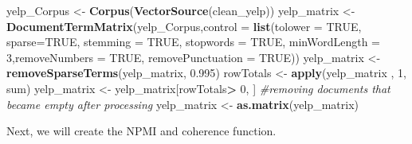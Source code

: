 \documentclass[]{article}
\newenvironment{Shaded}{\begin{snugshade}}{\end{snugshade}}
\newcommand{\CommentTok}[1]{\textcolor[rgb]{0.56,0.35,0.01}{\textit{#1}}}
\newcommand{\DataTypeTok}[1]{\textcolor[rgb]{0.13,0.29,0.53}{#1}}
\newcommand{\DecValTok}[1]{\textcolor[rgb]{0.00,0.00,0.81}{#1}}
\newcommand{\FloatTok}[1]{\textcolor[rgb]{0.00,0.00,0.81}{#1}}
\newcommand{\KeywordTok}[1]{\textcolor[rgb]{0.13,0.29,0.53}{\textbf{#1}}}
\newcommand{\NormalTok}[1]{#1}
\newcommand{\OperatorTok}[1]{\textcolor[rgb]{0.81,0.36,0.00}{\textbf{#1}}}
\newcommand{\OtherTok}[1]{\textcolor[rgb]{0.56,0.35,0.01}{#1}}
\newcommand{\StringTok}[1]{\textcolor[rgb]{0.31,0.60,0.02}{#1}}
\begin{document}
\begin{Shaded}
\begin{Highlighting}[]
\NormalTok{yelp_Corpus <-}\StringTok{ }\KeywordTok{Corpus}\NormalTok{(}\KeywordTok{VectorSource}\NormalTok{(clean_yelp))}
\NormalTok{yelp_matrix <-}\StringTok{ }\KeywordTok{DocumentTermMatrix}\NormalTok{(yelp_Corpus,}\DataTypeTok{control =} \KeywordTok{list}\NormalTok{(}\DataTypeTok{tolower =} \OtherTok{TRUE}\NormalTok{, }\DataTypeTok{sparse=}\OtherTok{TRUE}\NormalTok{, }\DataTypeTok{stemming =} \OtherTok{TRUE}\NormalTok{, }\DataTypeTok{stopwords =} \OtherTok{TRUE}\NormalTok{, }\DataTypeTok{minWordLength =} \DecValTok{3}\NormalTok{,}\DataTypeTok{removeNumbers =} \OtherTok{TRUE}\NormalTok{, }\DataTypeTok{removePunctuation =} \OtherTok{TRUE}\NormalTok{))}
\NormalTok{yelp_matrix <-}\StringTok{ }\KeywordTok{removeSparseTerms}\NormalTok{(yelp_matrix, }\FloatTok{0.995}\NormalTok{)}
\NormalTok{rowTotals <-}\StringTok{ }\KeywordTok{apply}\NormalTok{(yelp_matrix , }\DecValTok{1}\NormalTok{, sum) }
\NormalTok{yelp_matrix   <-}\StringTok{ }\NormalTok{yelp_matrix[rowTotals}\OperatorTok{>}\StringTok{ }\DecValTok{0}\NormalTok{, ]  }\CommentTok{#removing documents that became empty after processing  }
\NormalTok{yelp_matrix <-}\StringTok{ }\KeywordTok{as.matrix}\NormalTok{(yelp_matrix)}
\end{Highlighting}
\end{Shaded}

Next, we will create the NPMI and coherence function.
\end{document}
